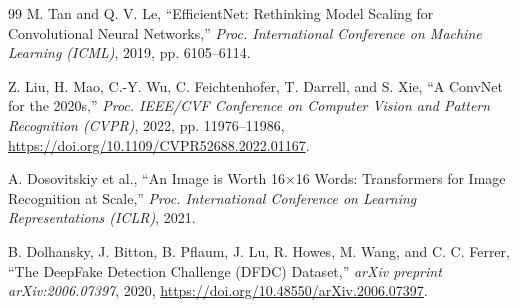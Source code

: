 \documentclass[pdflatex,sn-mathphys-num,iicol]{sn-jnl}
\begin{document}
\begin{thebibliography}{99}
M. Tan and Q. V. Le, ``EfficientNet: Rethinking Model Scaling for Convolutional Neural Networks,'' \textit{Proc. International Conference on Machine Learning (ICML)}, 2019, pp. 6105--6114.

Z. Liu, H. Mao, C.-Y. Wu, C. Feichtenhofer, T. Darrell, and S. Xie, ``A ConvNet for the 2020s,'' \textit{Proc. IEEE/CVF Conference on Computer Vision and Pattern Recognition (CVPR)}, 2022, pp. 11976--11986, \url{https://doi.org/10.1109/CVPR52688.2022.01167}.

A. Dosovitskiy et al., ``An Image is Worth 16$\times$16 Words: Transformers for Image Recognition at Scale,'' \textit{Proc. International Conference on Learning Representations (ICLR)}, 2021.

B. Dolhansky, J. Bitton, B. Pflaum, J. Lu, R. Howes, M. Wang, and C. C. Ferrer, ``The DeepFake Detection Challenge (DFDC) Dataset,'' \textit{arXiv preprint arXiv:2006.07397}, 2020, \url{https://doi.org/10.48550/arXiv.2006.07397}.

\end{thebibliography}
\end{document}
